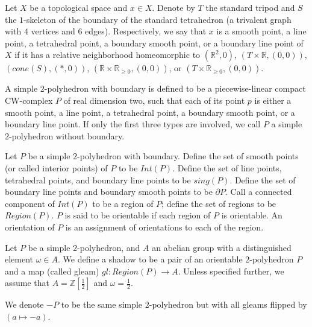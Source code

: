 \begin{definition}\label{def/local-shape}
  Let $X$ be a topological space and $x \in X$. Denote by $T$ the
  standard tripod and $S$ the $1$-skeleton of the boundary of the
  standard tetrahedron (a trivalent graph with $4$ vertices and
  $6$ edges). Respectively, we say that $x$ is a smooth point, a
  line point, a tetrahedral point, a boundary smooth point, or a
  boundary line point of $X$ if it has a relative neighborhood
  homeomorphic to $(\mathbb{R}^{2},0)$,
  $(T \times \mathbb{R}, (0, 0))$, $(cone(S), (*, 0))$,
  $(\mathbb{R} \times \mathbb{R}_{\geq 0}, (0, 0))$, or
  $(T \times \mathbb{R}_{\geq 0}, (0, 0))$.
\end{definition}

\begin{definition}\label{def/simple-2-polyhedron}
  A simple $2$-polyhedron with boundary is defined to be a
  piecewise-linear compact CW-complex $P$ of real dimension two,
  such that each of its point $p$ is either a smooth point, a
  line point, a tetrahedral point, a boundary smooth point, or a
  boundary line point. If only the first three types are
  involved, we call $P$ a simple $2$-polyhedron without boundary.
\end{definition}

\begin{definition}\label{def/components-of-a-simple-2-polyhedron}
  Let $P$ be a simple $2$-polyhedron with boundary. Define the
  set of smooth points (or called interior points) of $P$ to be
  $Int(P)$. Define the set of line points, tetrahedral points,
  and boundary line points to be $sing(P)$. Define the set of
  boundary line points and boundary smooth points to be
  $\partial P$. Call a connected component of $Int(P)$ to be a
  region of $P$; define the set of regions to be $Region(P)$. $P$
  is said to be orientable if each region of $P$ is orientable.
  An orientation of $P$ is an assignment of orientations to each
  of the region.
\end{definition}

\begin{definition}\label{def/shadowed-2-polyhedron}
  Let $P$ be a simple $2$-polyhedron, and $A$ an abelian group
  with a distinguished element $\omega \in A$. We define a shadow
  to be a pair of an orientable $2$-polyhedron $P$ and a map
  (called gleam) $gl: Region(P) \to A$. Unless specified further,
  we assume that $A = \mathbb{Z}\left[\frac{1}{2}\right]$ and
  $\omega = \frac{1}{2}$.

  \noindent We denote $-P$ to be the same simple $2$-polyhedron
  but with all gleams flipped by $(a \mapsto -a)$.
\end{definition}

